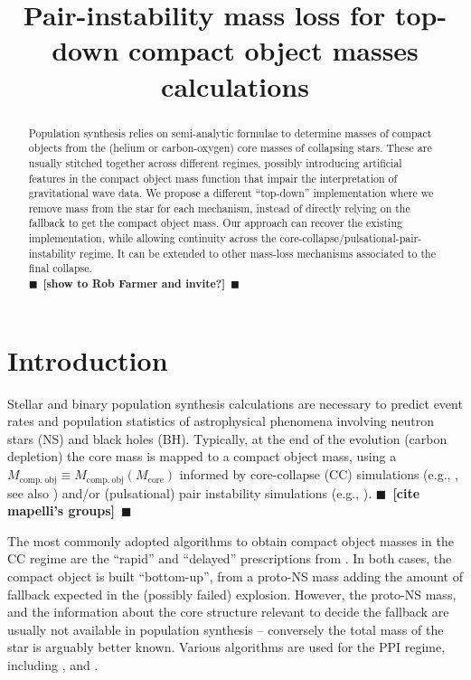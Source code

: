 \documentclass[twocolumn]{aastex63}
\newcommand{\todo}[1]{{\large $\blacksquare$~\textbf{\color{red}[#1]}}~$\blacksquare$}
\begin{document}
\title{Pair-instability mass loss for top-down compact object masses calculations}


\begin{abstract}
  Population synthesis relies on semi-analytic formulae to determine
  masses of compact objects from the (helium or carbon-oxygen) core
  masses of collapsing stars. These are usually stitched together
  across different regimes, possibly introducing artificial features
  in the compact object mass function that impair the interpretation
  of gravitational wave data. We propose a different ``top-down''
  implementation where we remove mass from the star for each
  mechanism, instead of directly relying on the fallback to get the
  compact object mass. Our approach can recover the existing
  implementation, while allowing continuity across the
  core-collapse/pulsational-pair-instability regime. It can be extended
  to other mass-loss mechanisms associated to the final collapse.\\

  \todo{show to Rob Farmer and invite?}
\end{abstract}

\section{Introduction}

Stellar and binary population synthesis calculations are necessary to
predict event rates and population statistics of astrophysical
phenomena involving neutron stars (NS) and
black holes (BH). Typically, at the end of the evolution (carbon
depletion) the core mass is mapped to a compact object mass, using a
$M_\mathrm{comp.\ obj}\equiv M_\mathrm{comp.\ obj}(M_\mathrm{core})$
informed by core-collapse (CC) simulations (e.g., \citealt{fryer:12,
  spera:15, mandel:20, couch:20}, see also \citealt{zapartas:21, patton:21}) and/or (pulsational) pair instability simulations
(e.g., \citealt{belczynski:16, woosley:17, stevenson:19, marchant:19, farmer:19}). \todo{cite
  mapelli's groups}

The most commonly adopted algorithms to obtain compact object masses
in the CC regime are the ``rapid'' and ``delayed''
prescriptions from \cite{fryer:12}. In both cases, the compact object
is built ``bottom-up'', from a proto-NS mass adding the amount of
fallback expected in the (possibly failed) explosion. However, the
proto-NS mass, and the information about the core structure relevant
to decide the fallback are usually not available in population
synthesis \citep[e.g.,][]{patton:20} -- conversely the total mass of
the star is arguably better known. Various algorithms are used for the
PPI regime, including \cite{belczynski:16, stevenson:19, marchant:19},
and \cite{farmer:19}.
\end{document}
